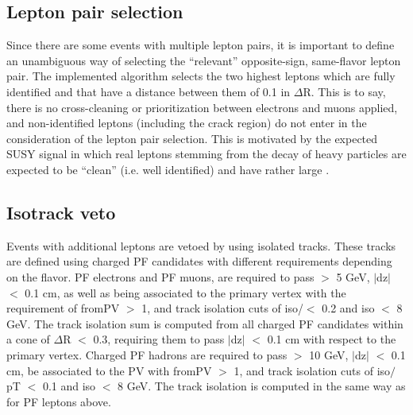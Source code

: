 \subsection{Lepton pair selection}
\label{subsub:pairsel}
Since there are some events with multiple lepton pairs, it is important to define an unambiguous way of selecting the ``relevant''  opposite-sign, same-flavor lepton pair. The implemented algorithm
selects the two highest \pt leptons which are fully identified and that have a distance between them of 0.1 in $\Delta$R. This is to say, there is no cross-cleaning or prioritization between 
electrons and muons applied, and non-identified leptons (including the crack region) do not enter in the consideration of the lepton pair selection. This is motivated by the expected SUSY signal 
in which real leptons stemming from the decay of heavy particles are expected to be ``clean'' (i.e. well identified) and have rather large \pt. 


\subsection{Isotrack veto}
\label{isotracks}
Events with additional leptons are vetoed by using isolated tracks. These tracks are defined using charged PF candidates with different requirements depending on the flavor. PF electrons 
and PF muons, are required to pass \pt $>$ 5 GeV, $|$dz$|$ $<$ 0.1 cm, as well as being associated to the primary vertex with the requirement of fromPV $>$ 1, and track isolation cuts of 
iso/\pt $<$ 0.2 and iso $<$ 8 GeV. The track isolation sum is computed from all charged PF candidates within a cone of $\Delta$R $<$ 0.3, requiring them to pass $|$dz$|$ $<$ 0.1 cm with respect 
to the primary vertex. Charged PF hadrons are required to pass \pt $>$ 10 GeV, $|$dz$|$ $<$ 0.1 cm, be associated to the PV with fromPV $>$ 1, and track isolation cuts of iso$/$pT $<$ 0.1 and 
iso $<$ 8 GeV. The track  isolation is computed in the same way as for PF leptons above.


